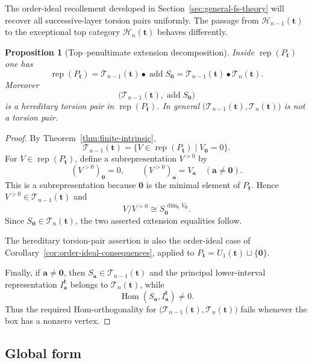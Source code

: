 \documentclass[12pt,reqno]{amsart}
\newtheorem{proposition}[theorem]{Proposition}
\theoremstyle{definition}
\theoremstyle{remark}
\newcommand{\Rep}{\operatorname{rep}}
\newcommand{\Hom}{\operatorname{Hom}}
\begin{document}
The order-ideal recollement developed in
Section~\ref{sec:general-fs-theory} will recover all successive-layer torsion
pairs uniformly.  The passage from $\mathcal H_{n-1}(\mathbf t)$ to the exceptional top category
$\mathcal H_n(\mathbf t)$ behaves differently.

\begin{proposition}[Top--penultimate extension decomposition]\label{prop:top-penultimate}
Inside $\Rep(P_{\mathbf t})$ one has
\[
\Rep(P_{\mathbf t})
=
\mathcal T_{n-1}(\mathbf t)\bullet\operatorname{add}S_{\mathbf0}
=
\mathcal T_{n-1}(\mathbf t)\bullet\mathcal T_n(\mathbf t).
\]
Moreover
\[
\bigl(\mathcal T_{n-1}(\mathbf t),\operatorname{add}S_{\mathbf0}\bigr)
\]
is a hereditary torsion pair in $\Rep(P_{\mathbf t})$.  In general
$\bigl(\mathcal T_{n-1}(\mathbf t),\mathcal T_n(\mathbf t)\bigr)$ is
not a torsion pair.
\end{proposition}

\begin{proof}
By Theorem~\ref{thm:finite-intrinsic},
\[
\mathcal T_{n-1}(\mathbf t)
=
\{V\in\Rep(P_{\mathbf t})\mid V_{\mathbf0}=0\}.
\]
For $V\in\Rep(P_{\mathbf t})$, define a subrepresentation $V^{>0}$ by
\[
(V^{>0})_{\mathbf0}=0,
\qquad
(V^{>0})_{\mathbf a}=V_{\mathbf a}
\quad(\mathbf a\ne\mathbf0).
\]
This is a subrepresentation because $\mathbf0$ is the minimal element of
$P_{\mathbf t}$.  Hence
$V^{>0}\in\mathcal T_{n-1}(\mathbf t)$ and
\[
V/V^{>0}\cong
S_{\mathbf0}^{\,\dim_\Bbbk V_{\mathbf0}}.
\]
Since $S_{\mathbf0}\in\mathcal T_n(\mathbf t)$, the two asserted
extension equalities follow.

The hereditary torsion-pair assertion is also the order-ideal case
of Corollary~\ref{cor:order-ideal-consequences}, applied to
$P_{\mathbf t}=U_1(\mathbf t)\sqcup\{\mathbf0\}$.

Finally, if $\mathbf a\ne\mathbf0$, then
$S_{\mathbf a}\in\mathcal T_{n-1}(\mathbf t)$ and the principal
lower-interval representation
$I^{\mathbf t}_{\mathbf a}$ belongs to $\mathcal T_n(\mathbf t)$,
while
\[
\Hom(S_{\mathbf a},I^{\mathbf t}_{\mathbf a})\ne0.
\]
Thus the required Hom-orthogonality for
$\bigl(\mathcal T_{n-1}(\mathbf t),\mathcal T_n(\mathbf t)\bigr)$
fails whenever the box has a nonzero vertex.
\end{proof}


\subsection{Global form}\label{sec:global}
\end{document}
